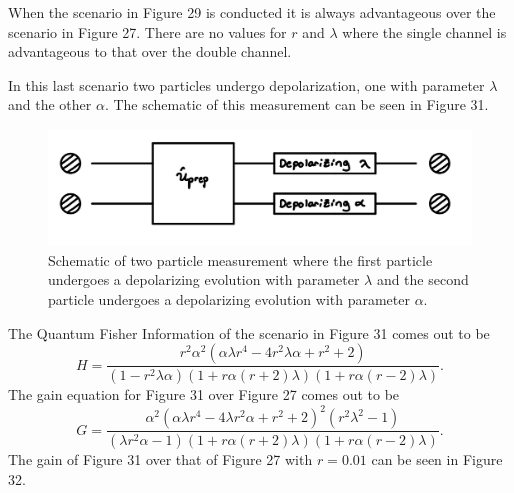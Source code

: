 \documentclass[twocolumn]{article}
\begin{document}
\newline
When the scenario in Figure 29 is conducted it is always advantageous over the scenario in Figure 27. There are no values for $r$ and $\lambda$ where the single channel is advantageous to that over the double channel.

In this last scenario two particles undergo depolarization, one with parameter $\lambda$ and the other $\alpha$. The schematic of this measurement can be seen in Figure 31.
\begin{figure}[h]
\begin{center}
\includegraphics[width=0.65\linewidth]{Depolarizing-Double-Channel-Alpha-and-Lambda-Schematic.jpg}
\caption{Schematic of two particle measurement where the first particle undergoes a depolarizing evolution with parameter $\lambda$ and the second particle undergoes a depolarizing evolution with parameter $\alpha$.}
\end{center}
\end{figure}
\newline
The Quantum Fisher Information of the scenario in Figure 31 comes out to be
\begin{equation}\label{eq:106}
H=\frac{r^2\alpha^2(\alpha\lambda r^4-4r^2\lambda\alpha+r^2+2)}{(1-r^2\lambda\alpha)(1+r\alpha(r+2)\lambda)(1+r\alpha(r-2)\lambda)}.
\end{equation}
The gain equation for Figure 31 over Figure 27 comes out to be
\begin{equation}\label{eq:107}
G=\frac{\alpha^2(\alpha\lambda r^4-4\lambda r^2\alpha+r^2+2)^2(r^2\lambda^2-1)}{(\lambda r^2\alpha-1)(1+r\alpha(r+2)\lambda)(1+r\alpha(r-2)\lambda)}.
\end{equation}
The gain of Figure 31 over that of Figure 27 with $r=0.01$ can be seen in Figure 32.
\end{document}
